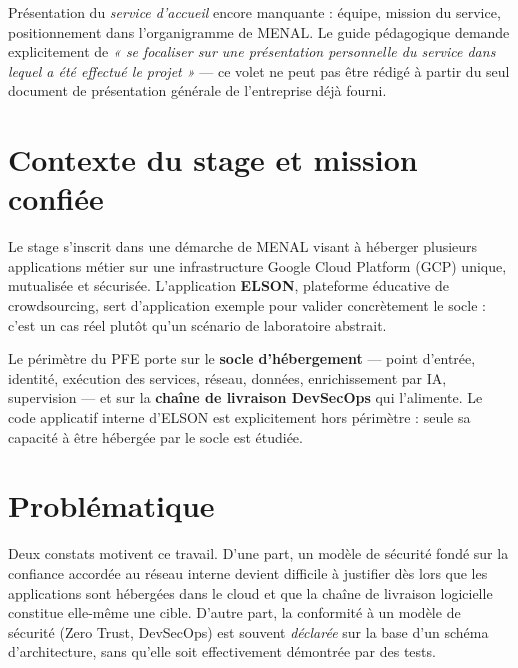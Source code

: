 \begin{attentedoc}
Présentation du \emph{service d'accueil} encore manquante : équipe, mission du service,
positionnement dans l'organigramme de MENAL. Le guide pédagogique demande explicitement de
\emph{« se focaliser sur une présentation personnelle du service dans lequel a été effectué
le projet »} --- ce volet ne peut pas être rédigé à partir du seul document de présentation
générale de l'entreprise déjà fourni.
\end{attentedoc}

\section{Contexte du stage et mission confiée}

Le stage s'inscrit dans une démarche de MENAL visant à héberger plusieurs applications
métier sur une infrastructure Google Cloud Platform (GCP) unique, mutualisée et sécurisée.
L'application \textbf{ELSON}, plateforme éducative de crowdsourcing, sert d'application
exemple pour valider concrètement le socle : c'est un cas réel plutôt qu'un scénario de
laboratoire abstrait.

\begin{keybox}[title=Périmètre du projet]
Le périmètre du PFE porte sur le \textbf{socle d'hébergement} --- point d'entrée, identité,
exécution des services, réseau, données, enrichissement par IA, supervision --- et sur la
\textbf{chaîne de livraison DevSecOps} qui l'alimente. Le code applicatif interne d'ELSON
est explicitement hors périmètre : seule sa capacité à être hébergée par le socle est
étudiée.
\end{keybox}


\section{Problématique}
\label{sec:problematique}

Deux constats motivent ce travail. D'une part, un modèle de sécurité fondé sur la confiance
accordée au réseau interne devient difficile à justifier dès lors que les applications sont
hébergées dans le cloud et que la chaîne de livraison logicielle constitue elle-même une
cible. D'autre part, la conformité à un modèle de sécurité (Zero Trust, DevSecOps) est
souvent \emph{déclarée} sur la base d'un schéma d'architecture, sans qu'elle soit
effectivement démontrée par des tests.

